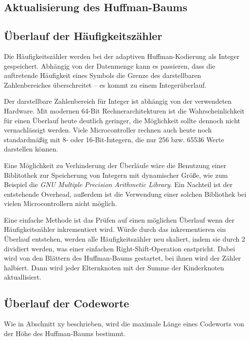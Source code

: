 \documentclass[twoside,11pt,a4paper]{article}
\theoremstyle{break}
\begin{document}
\subsection{Aktualisierung des Huffman-Baums}


\subsection{Überlauf der Häufigkeitszähler}

Die Häufigkeitszähler werden bei der adaptiven Huffman-Kodierung als Integer
gespeichert. Abhängig von der Datenmenge kann es passieren, dass die auftretende
Häufigkeit eines Symbols die Grenze des darstellbaren Zahlenbereiches
überschreitet -- es kommt zu einem Integerüberlauf.

Der darstellbare Zahlenbereich für Integer ist abhängig von der verwendeten
Hardware. Mit modernen 64-Bit Rechnerarchitekturen ist die Wahrscheinlichkeit
für einen Überlauf heute deutlich geringer, die Möglichkeit sollte dennoch
nicht vernachlässigt werden. Viele Microcontroller rechnen auch heute noch
standardmäßig mit 8- oder 16-Bit-Integern, die nur 256 bzw. 65536 Werte
darstellen können.

Eine Möglichkeit zu Verhinderung der Überläufe wäre die Benutzung einer
Biblitothek zur Speicherung von Integern mit dynamischer Größe, wie zum Beispiel
die \emph{GNU Multiple Precision Arithmetic Library}\cite{GMP}. Ein Nachteil ist
der entstehende Overhead, außerdem ist die Verwendung einer solchen Bibliothek
bei vielen Microcontrollern nicht möglich.

Eine einfache Methode ist das Prüfen auf einen möglichen Überlauf wenn der
Häufigkeitszähler inkrementiert wird. Würde durch das inkrementieren ein
Überlauf entstehen, werden alle Häufigkeitszähler neu skaliert, indem sie durch
2 dividiert werden, was einer einfachen Right-Shift-Operation enstpricht. Dabei
wird von den Blättern des Huffman-Baums gestartet, bei ihnen wird der Zähler
halbiert. Dann wird jeder Elternknoten mit der Summe der Kinderknoten
aktuallisiert.

\subsection{Überlauf der Codeworte}

Wie in Abschnitt xy beschrieben, wird die maximale Länge eines Codeworts
von der Höhe des Huffman-Baums bestimmt.
\end{document}
